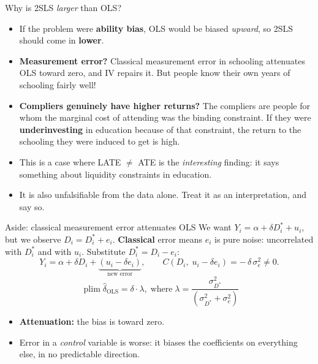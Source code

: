 \documentclass[
  11pt,
  ignorenonframetext,
  aspectratio=169,
]{beamer}
\providecommand{\tightlist}{%
  \setlength{\itemsep}{0pt}\setlength{\parskip}{0pt}}
\begin{document}
\begin{frame}{Why is 2SLS \emph{larger} than OLS?}
\protect{}\label{why-is-2sls-larger-than-ols}
\begin{itemize}
\tightlist
\item
  If the problem were \textbf{ability bias}, OLS would be biased
  \emph{upward}, so 2SLS should come in \textbf{lower}.
\item
  \textbf{Measurement error?} Classical measurement error in schooling
  attenuates OLS toward zero, and IV repairs it. But people know their
  own years of schooling fairly well!
\item
  \textbf{Compliers genuinely have higher returns?} The compliers are
  people for whom the marginal cost of attending was the binding
  constraint. If they were \textbf{underinvesting} in education because
  of that constraint, the return to the schooling they were induced to
  get is high.
\item
  This is a case where LATE \(\neq\) ATE is the \emph{interesting}
  finding: it says something about liquidity constraints in education.
\item
  It is also unfalsifiable from the data alone. Treat it as an
  interpretation, and say so.
\end{itemize}
\end{frame}

\begin{frame}{Aside: classical measurement error attenuates OLS}
\protect{}\label{aside-classical-measurement-error-attenuates-ols}
We want \(Y_i = \alpha + \delta D^*_i + u_i\), but we observe
\(D_i = D^*_i + e_i\). \textbf{Classical} error means \(e_i\) is pure
noise: uncorrelated with \(D^*_i\) and with \(u_i\). Substitute
\(D^*_i = D_i - e_i\):
\[ Y_i = \alpha + \delta D_i + \underbrace{(u_i - \delta e_i)}_{\text{new error}},\qquad C(D_i,\; u_i - \delta e_i) = -\,\delta\,\sigma^2_e \neq 0.\]
\[\ \operatorname{plim} \hat\delta_{\text{OLS}} = \delta \cdot \lambda,\; \text{where}\; \lambda = \frac{\sigma^2_{D^*}}{(\sigma^2_{D^*} + \sigma^2_e)}\]

\begin{itemize}
\tightlist
\item
  \textbf{Attenuation:} the bias is toward zero.
\item
  Error in a \emph{control} variable is worse: it biases the
  coefficients on everything else, in no predictable direction.
\end{itemize}
\end{frame}
\end{document}
